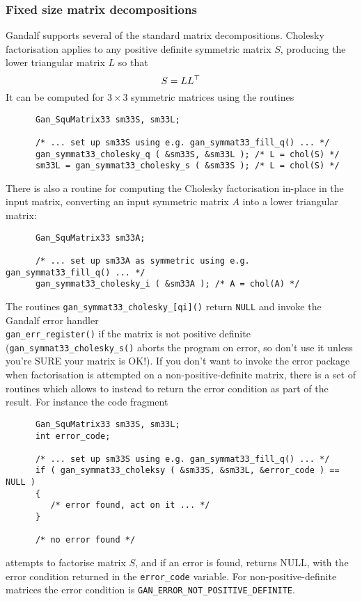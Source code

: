 \subsubsection{Fixed size matrix decompositions} \label{fixed-decomp-sec}
Gandalf supports several of the standard matrix decompositions. Cholesky
factorisation applies to any positive definite symmetric matrix $S$, producing
the lower triangular matrix $L$ so that
\[ S = L L^{\top}
\]
It can be computed for $3\times 3$ symmetric matrices using the routines
\begin{verbatim}
      Gan_SquMatrix33 sm33S, sm33L;

      /* ... set up sm33S using e.g. gan_symmat33_fill_q() ... */
      gan_symmat33_cholesky_q ( &sm33S, &sm33L ); /* L = chol(S) */
      sm33L = gan_symmat33_cholesky_s ( &sm33S ); /* L = chol(S) */
\end{verbatim}
There is also a routine for computing the Cholesky factorisation in-place
in the input matrix, converting an input symmetric matrix $A$ into a lower
triangular matrix:
\begin{verbatim}
      Gan_SquMatrix33 sm33A;

      /* ... set up sm33A as symmetric using e.g. gan_symmat33_fill_q() ... */
      gan_symmat33_cholesky_i ( &sm33A ); /* A = chol(A) */
\end{verbatim}
The routines {\tt gan\_symmat33\_cholesky\_[qi]()} return {\tt NULL} and
invoke the Gandalf error handler\\ {\tt gan\_err\_register()} if the matrix
is not positive definite ({\tt gan\_symmat33\_cholesky\_s()} aborts the
program on error, so don't use it unless you're SURE your matrix is OK!).
If you don't want to invoke the error package when factorisation is attempted
on a non-positive-definite matrix, there is a set of routines which allows
to instead to return the error condition as part of the result.
For instance the code fragment
\begin{verbatim}
      Gan_SquMatrix33 sm33S, sm33L;
      int error_code;

      /* ... set up sm33S using e.g. gan_symmat33_fill_q() ... */
      if ( gan_symmat33_choleksy ( &sm33S, &sm33L, &error_code ) == NULL )
      {
         /* error found, act on it ... */
      }

      /* no error found */
\end{verbatim}
attempts to factorise matrix $S$, and if an error is found, returns NULL,
with the error condition returned in the {\tt error\_code} variable.
For non-positive-definite matrices the error condition is
{\tt GAN\_ERROR\_NOT\_POSITIVE\_DEFINITE}.

